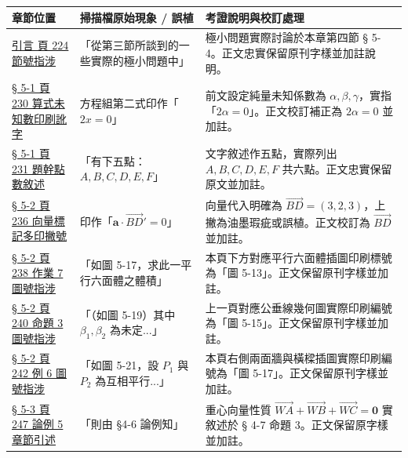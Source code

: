\documentclass[a4paper,12pt,twoside]{article}
\begin{document}
\begin{table}[H]
\centering
\small
\renewcommand{\arraystretch}{1.35}
\begin{tabularx}{\textwidth}{|p{3.2cm}|p{3.8cm}|X|}
\hline
\textbf{章節位置} & \textbf{掃描檔原始現象 / 誤植} & \textbf{考證說明與校訂處理} \\ \hline

\hyperref[note:b3s-ch5-p224-sec-ref]{引言 頁 224 節號指涉} & 
「從第三節所談到的一些實際的極小問題中」 & 
極小問題實際討論於本章第四節 § 5-4。正文忠實保留原刊字樣並加註說明。 \\ \hline

\hyperref[note:b3s-ch5-p230-2alpha-typo]{§ 5-1 頁 230 算式未知數印刷訛字} & 
方程組第二式印作「$2x = 0$」 & 
前文設定純量未知係數為 $\alpha, \beta, \gamma$，實指「$2\alpha = 0$」。正文校訂補正為 $2\alpha = 0$ 並加註。 \\ \hline

\hyperref[note:b3s-ch5-p231-ex3-points]{§ 5-1 頁 231 題幹點數敘述} & 
「有下五點：$A, B, C, D, E, F$」 & 
文字敘述作五點，實際列出 $A, B, C, D, E, F$ 共六點。正文忠實保留原文並加註。 \\ \hline

\hyperref[note:b3s-ch5-p236-bd-prime]{§ 5-2 頁 236 向量標記多印撇號} & 
印作「$\mathbf{a} \cdot \vec{BD}' = 0$」 & 
向量代入明確為 $\vec{BD} = (3, 2, 3)$，上撇為油墨瑕疵或誤植。正文校訂為 $\vec{BD}$ 並加註。 \\ \hline

\hyperref[note:b3s-ch5-p238-fig-ref]{§ 5-2 頁 238 作業 7 圖號指涉} & 
「如圖 5-17，求此一平行六面體之體積」 & 
本頁下方對應平行六面體插圖印刷標號為「圖 5-13」。正文保留原刊字樣並加註。 \\ \hline

\hyperref[note:b3s-ch5-p240-fig-ref]{§ 5-2 頁 240 命題 3 圖號指涉} & 
「（如圖 5-19）其中 $\beta_1, \beta_2$ 為未定...」 & 
上一頁對應公垂線幾何圖實際印刷編號為「圖 5-15」。正文保留原刊字樣並加註。 \\ \hline

\hyperref[note:b3s-ch5-p242-fig-ref]{§ 5-2 頁 242 例 6 圖號指涉} & 
「如圖 5-21，設 $P_1$ 與 $P_2$ 為互相平行...」 & 
本頁右側兩面牆與橫樑插圖實際印刷編號為「圖 5-17」。正文保留原刊字樣並加註。 \\ \hline

\hyperref[note:b3s-ch5-p247-sec-ref]{§ 5-3 頁 247 論例 5 章節引述} & 
「則由 §4-6 論例知」 & 
重心向量性質 $\vec{WA} + \vec{WB} + \vec{WC} = \mathbf{0}$ 實敘述於 § 4-7 命題 3。正文保留原字樣並加註。 \\ \hline


\end{tabularx}
\end{table}
\end{document}
